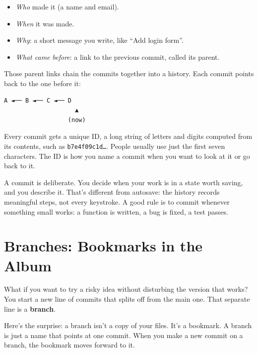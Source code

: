 \begin{itemize}
\tightlist
\item
  \emph{Who} made it (a name and email).
\item
  \emph{When} it was made.
\item
  \emph{Why}: a short message you write, like ``Add login form''.
\item
  \emph{What came before}: a link to the previous commit, called its parent.
\end{itemize}


Those parent links chain the commits together into a history. Each commit points back to the one before it:

\begin{codeblock}
\begin{Verbatim}[breaklines=false, fontsize=\fontsize{8.8}{8.68}\selectfont, fontfamily=diagrammono, formatcom=\diagramlines]
  A ◄── B ◄── C ◄── D
                    ▲
                  (now)
\end{Verbatim}
\end{codeblock}

Every commit gets a unique ID, a long string of letters and digits computed from its contents, such as \texttt{b7e4f09c1d…}. People usually use just the first seven characters. The ID is how you name a commit when you want to look at it or go back to it.

A commit is deliberate. You decide when your work is in a state worth saving, and you describe it. That's different from autosave: the history records meaningful steps, not every keystroke. A good rule is to commit whenever something small works: a function is written, a bug is fixed, a test passes.

\section{Branches: Bookmarks in the Album}\label{04-why-code-needs-a-history:branches-bookmarks-in-the-album}

What if you want to try a risky idea without disturbing the version that works? You start a new line of commits that splits off from the main one. That separate line is a \textbf{branch}.

Here's the surprise: a branch isn't a copy of your files. It's a bookmark. A branch is just a name that points at one commit. When you make a new commit on a branch, the bookmark moves forward to it.

